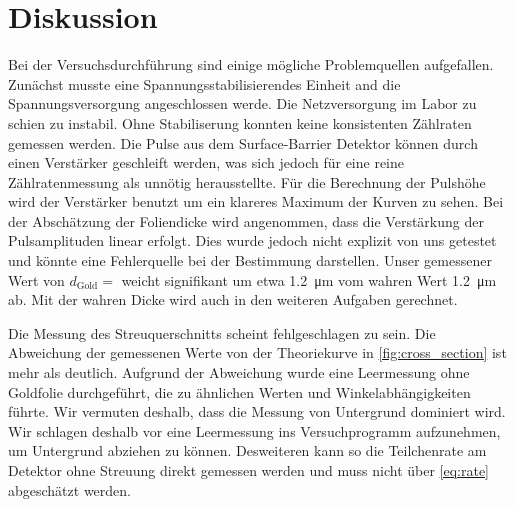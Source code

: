 \section{Diskussion}

Bei der Versuchsdurchführung sind einige mögliche Problemquellen aufgefallen.
Zunächst musste eine Spannungsstabilisierendes Einheit and die Spannungsversorgung angeschlossen werde.
Die Netzversorgung im Labor zu schien zu instabil. Ohne Stabiliserung konnten keine konsistenten Zählraten gemessen werden.
Die Pulse aus dem Surface-Barrier Detektor können durch einen Verstärker geschleift werden, was sich jedoch für eine reine Zählratenmessung
als unnötig herausstellte.
Für die Berechnung der Pulshöhe wird der Verstärker benutzt um ein klareres Maximum der Kurven zu sehen.
Bei der Abschätzung der Foliendicke wird angenommen, dass die Verstärkung der Pulsamplituden linear erfolgt.
Dies wurde jedoch nicht explizit von uns getestet und könnte eine Fehlerquelle bei der Bestimmung darstellen.
Unser gemessener Wert von $d_\text{Gold} = $ weicht signifikant um etwa \SI{1.2}{\micro\meter} vom wahren Wert \SI{1.2}{\micro\meter} ab.
Mit der wahren Dicke wird auch in den weiteren Aufgaben gerechnet.

Die Messung des Streuquerschnitts scheint fehlgeschlagen zu sein. Die Abweichung der gemessenen Werte von der Theoriekurve in \autoref{fig:cross_section} ist mehr als deutlich.
Aufgrund der Abweichung wurde eine Leermessung ohne Goldfolie durchgeführt, die zu ähnlichen Werten und Winkelabhängigkeiten führte.
Wir vermuten deshalb, dass  die Messung von Untergrund dominiert wird.
Wir schlagen deshalb vor eine Leermessung ins Versuchprogramm aufzunehmen, um Untergrund abziehen zu können.
Desweiteren kann so die Teilchenrate am Detektor ohne Streuung direkt gemessen werden und muss nicht über \eqref{eq:rate} abgeschätzt werden.
